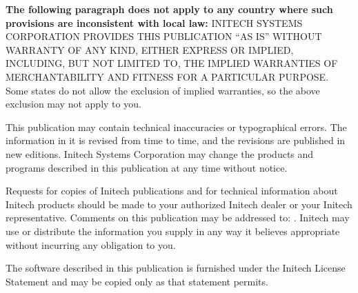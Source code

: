 \begin{TitleVerso}
{\imLegalFont
\textbf{The following paragraph does not apply to any country where such
provisions are inconsistent with local law:} INITECH SYSTEMS CORPORATION
PROVIDES THIS PUBLICATION ``AS IS'' WITHOUT WARRANTY OF ANY KIND, EITHER
EXPRESS OR IMPLIED, INCLUDING, BUT NOT LIMITED TO, THE IMPLIED WARRANTIES OF
MERCHANTABILITY AND FITNESS FOR A PARTICULAR PURPOSE.  Some states do not
allow the exclusion of implied warranties, so the above exclusion may not
apply to you.\par
This publication may contain technical inaccuracies or typographical errors.
The information in it is revised from time to time, and the revisions are
published in new editions.  Initech Systems Corporation may change the
products and programs described in this publication at any time without
notice.\par
Requests for copies of Initech publications and for technical information
about Initech products should be made to your authorized Initech dealer or
your Initech representative.  Comments on this publication may be addressed
to: \InitechAddressLine.
Initech may use or distribute the information you supply in any way it
believes appropriate without incurring any obligation to you.\par
The software described in this publication is furnished under the Initech
License Statement and may be copied only as that statement permits.\par}
\end{TitleVerso}
